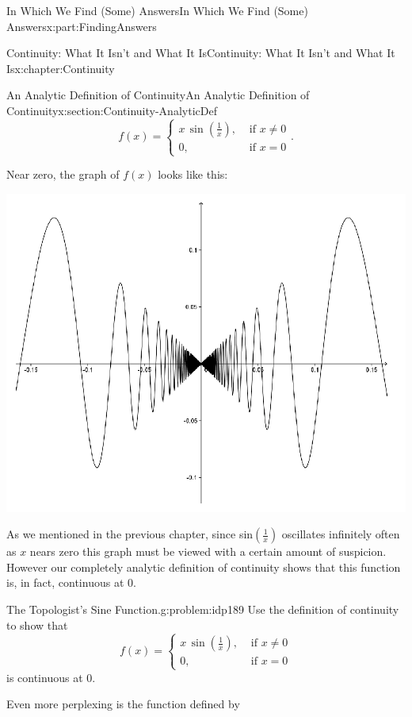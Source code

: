 \documentclass[oneside,10pt,]{book}
\numberwithin{equation}{section}
\newcommand{\amp}{&}
\begin{document}
\begin{partptx}{In Which We Find (Some) Answers}{}{In Which We Find (Some) Answers}{}{}{x:part:FindingAnswers}
\begin{chapterptx}{Continuity: What It Isn't and What It Is}{}{Continuity: What It Isn't and What It Is}{}{}{x:chapter:Continuity}
\begin{sectionptx}{An Analytic Definition of Continuity}{}{An Analytic Definition of Continuity}{}{}{x:section:Continuity-AnalyticDef}
\begin{equation*}
f(x)= \begin{cases}
x\,\sin\left(\frac{1}{x}\right),\amp \text{ if } x\neq 0\\
0, \amp \text{ if } x=0 
\end{cases}  \text{.}
\end{equation*}
%
\par
Near zero, the graph of \(f(x)\) looks like this:%
\begin{image}{0.125}{0.75}{0.125}%
\includegraphics[width=\linewidth]{images/Ch5fig4.png}
\end{image}%
As we mentioned in the previous chapter, since sin\(\left(\frac{1}{x}\right)\) oscillates infinitely often as \(x\) nears zero this graph must be viewed with a certain amount of suspicion.  However our completely analytic definition of continuity shows that this function is, in fact, continuous at 0.%
\begin{problem}{The Topologist's Sine Function.}{g:problem:idp189}%
 Use the definition of continuity to show that%
\begin{equation*}
f(x)= \begin{cases}
x\,\sin\left(\frac{1}{x}\right),\amp \text{ if } x\neq 0\\ 
0, \amp \text{ if } x=0 
\end{cases}
\end{equation*}
is continuous at \(0\).%
\end{problem}
Even more perplexing is the function defined by%

\end{sectionptx}
\end{chapterptx}
\end{partptx}
\end{document}
